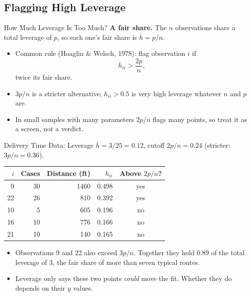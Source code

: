 \subsection{Flagging High Leverage}


\begin{frame}{How Much Leverage Is Too Much?}
    \textbf{A fair share.} The $n$ observations share a total leverage of $p$, so each one's fair share is $\bar h=p/n$.
    \svspace{0.5em}
    \begin{itemize}
        \item Common rule (Hoaglin \& Welsch, 1978): flag observation $i$ if
        \[
        h_{ii}>\frac{2p}{n},
        \]
        twice its fair share.
        \item $3p/n$ is a stricter alternative; $h_{ii}>0.5$ is very high leverage whatever $n$ and $p$ are.
        \item In small samples with many parameters $2p/n$ flags many points, so treat it as a screen, not a verdict.
    \end{itemize}
\end{frame}


\begin{frame}{Delivery Time Data: Leverage}
    $\bar h=3/25=0.12$, cutoff $2p/n=0.24$ (stricter: $3p/n=0.36$).
    \begin{center}
        \small
        \begin{tabular}{rrrrc}
            \toprule
            $i$ & Cases & Distance (ft) & $h_{ii}$ & Above $2p/n$? \\
            \midrule
            9 & 30 & 1460 & 0.498 & yes \\
            22 & 26 & 810 & 0.392 & yes \\
            10 & 5 & 605 & 0.196 & no \\
            16 & 10 & 776 & 0.166 & no \\
            21 & 10 & 140 & 0.165 & no \\
            \bottomrule
        \end{tabular}
    \end{center}
    \begin{itemize}
        \item Observations 9 and 22 also exceed $3p/n$. Together they hold 0.89 of the total leverage of 3, the fair share of more than seven typical routes.
        \item Leverage only says these two points \emph{could} move the fit. Whether they do depends on their $y$ values.
    \end{itemize}
\end{frame}


